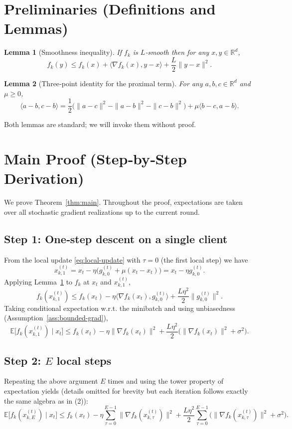 \documentclass[11pt]{article}
\newtheorem{lemma}{Lemma}
\newcommand{\R}{\mathbb{R}}
\begin{document}
\newpage

\section*{Preliminaries (Definitions and Lemmas)}
\begin{lemma}[Smoothness inequality]\label{lem:smooth}
If $f_k$ is $L$‑smooth then for any $x,y\in\R^d$,
\[
f_k(y)\le f_k(x)+\langle \nabla f_k(x),y-x\rangle+\frac{L}{2}\|y-x\|^2 .
\]
\end{lemma}
\begin{lemma}[Three‑point identity for the proximal term]\label{lem:prox}
For any $a,b,c\in\R^d$ and $\mu\ge0$,
\[
\langle a-b,c-b\rangle = \frac12\bigl(\|a-c\|^2-\|a-b\|^2-\|c-b\|^2\bigr)+\mu\langle b-c,a-b\rangle .
\]
\end{lemma}
Both lemmas are standard; we will invoke them without proof.

\section*{Main Proof (Step‑by‑Step Derivation)}
We prove Theorem~\ref{thm:main}. Throughout the proof, expectations are taken over all stochastic gradient realizations up to the current round.

\subsection*{Step 1: One‑step descent on a single client}
From the local update \eqref{eq:local-update} with $\tau=0$ (the first local step) we have
\[
x_{k,1}^{(t)} = x_t - \eta\bigl(g_{k,0}^{(t)}+\mu(x_t-x_t)\bigr)=x_t-\eta g_{k,0}^{(t)} .
\]
Applying Lemma~\ref{lem:smooth} to $f_k$ at $x_t$ and $x_{k,1}^{(t)}$,
\[
f_k(x_{k,1}^{(t)}) \le f_k(x_t) -\eta\langle \nabla f_k(x_t),g_{k,0}^{(t)}\rangle +\frac{L\eta^2}{2}\|g_{k,0}^{(t)}\|^2 . \tag{1}
\]
Taking conditional expectation w.r.t. the minibatch and using unbiasedness (Assumption~\ref{ass:bounded-grad}),
\[
\mathbb{E}\bigl[f_k(x_{k,1}^{(t)})\mid x_t\bigr]
\le f_k(x_t) -\eta\|\nabla f_k(x_t)\|^2 +\frac{L\eta^2}{2}\bigl(\|\nabla f_k(x_t)\|^2+\sigma^2\bigr). \tag{2}
\]

\subsection*{Step 2: $E$ local steps}
Repeating the above argument $E$ times and using the tower property of expectation yields (details omitted for brevity but each iteration follows exactly the same algebra as in (2)):
\[
\mathbb{E}\!\bigl[f_k(x_{k,E}^{(t)})\mid x_t\bigr]
\le f_k(x_t) -\eta\sum_{\tau=0}^{E-1}\|\nabla f_k(x_{k,\tau}^{(t)})\|^2
+ \frac{L\eta^2}{2}\sum_{\tau=0}^{E-1}\bigl(\|\nabla f_k(x_{k,\tau}^{(t)})\|^2+\sigma^2\bigr). \tag{3}
\]
\end{document}
